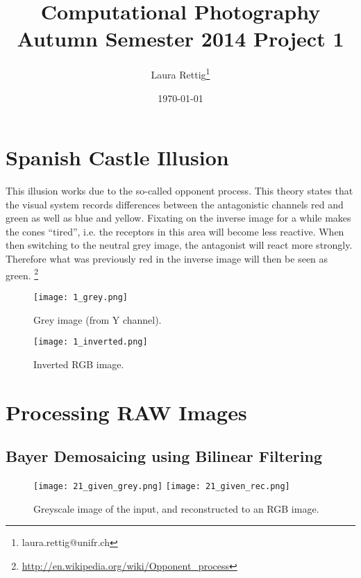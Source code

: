 \documentclass[11pt,a4]{article}
\title{
        Computational Photography \linebreak Autumn Semester 2014 \linebreak
        \bf{Project 1}
}
\author{
        Laura Rettig\footnote{laura.rettig@unifr.ch}
       }
\date{\normalsize \today}
\begin{document}

\maketitle

\section{Spanish Castle Illusion}

This illusion works due to the so-called opponent process. This theory states that the visual system records differences between the antagonistic channels red and green as well as blue and yellow. Fixating on the inverse image for a while makes the cones ``tired'', i.e. the receptors in this area will become less reactive. When then switching to the neutral grey image, the antagonist will react more strongly. Therefore what was previously red in the inverse image will then be seen as green. \footnote{\url{http://en.wikipedia.org/wiki/Opponent_process}}

\begin{figure}[htb]
    \begin{center}
    	\texttt{[image: 1\_grey.png]}
        \caption{Grey image (from Y channel).}
    \end{center}
\end{figure}
\begin{figure}[htb]
    \begin{center}
        \texttt{[image: 1\_inverted.png]}
        \caption{Inverted RGB image.}
    \end{center}
\end{figure}

\newpage
\FloatBarrier
\section{Processing RAW Images}

\subsection{Bayer Demosaicing using Bilinear Filtering}

\begin{figure}[htb]
    \begin{center}
    	\texttt{[image: 21\_given\_grey.png]}
    	\texttt{[image: 21\_given\_rec.png]}
        \caption{Greyscale image of the input, and reconstructed to an RGB image.}
    \end{center}
\end{figure}
\FloatBarrier
\end{document}
